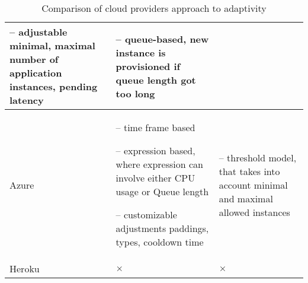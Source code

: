\begin{table}[!htbp]
\begin{tabularx}{\textwidth}[]{ X  X X }
-- adjustable minimal, maximal number of application instances, pending latency

 &
-- queue-based, new instance is provisioned if queue length got too long 
  \\ \hline

Azure & 
-- time frame based

-- expression based, where expression can involve either CPU usage or Queue length

-- customizable adjustments paddings, types, cooldown time
&
-- threshold model, that takes into account minimal and maximal allowed instances
 \\ \hline

Heroku & $\times$ & $\times$ \\ \hline
\end{tabularx}

\caption{Comparison of cloud providers approach to adaptivity}
\label{tab:cloud-providers-adaptivity}

\end{table}





